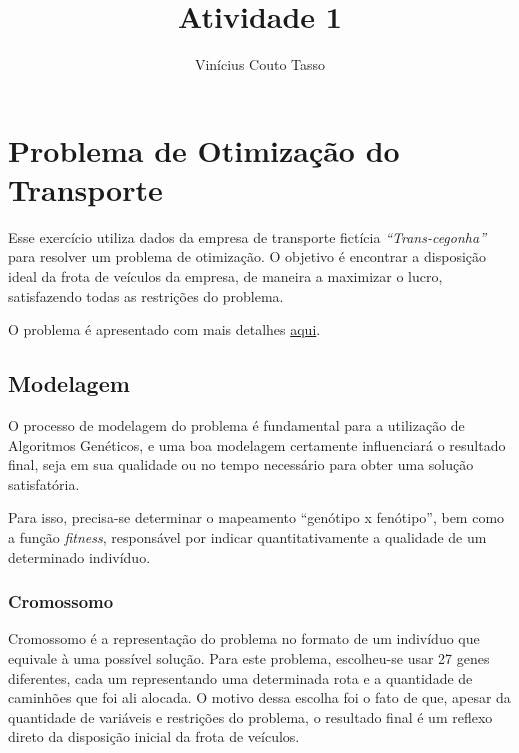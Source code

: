 \documentclass[11pt]{article}
\title{Atividade 1}
\author{Vinícius Couto Tasso}
\begin{document}
    
    \maketitle
    
    

    
    \hypertarget{problema-de-otimizauxe7uxe3o-do-transporte}{%
\section{Problema de Otimização do
Transporte}\label{problema-de-otimizauxe7uxe3o-do-transporte}}

Esse exercício utiliza dados da empresa de transporte fictícia
\emph{``Trans-cegonha''} para resolver um problema de otimização. O
objetivo é encontrar a disposição ideal da frota de veículos da empresa,
de maneira a maximizar o lucro, satisfazendo todas as restrições do
problema.

O problema é apresentado com mais detalhes \href{transporte4.pdf}{aqui}.

    \hypertarget{modelagem}{%
\subsection{Modelagem}\label{modelagem}}

O processo de modelagem do problema é fundamental para a utilização de
Algoritmos Genéticos, e uma boa modelagem certamente influenciará o
resultado final, seja em sua qualidade ou no tempo necessário para obter
uma solução satisfatória.

Para isso, precisa-se determinar o mapeamento ``genótipo x fenótipo'',
bem como a função \emph{fitness}, responsável por indicar
quantitativamente a qualidade de um determinado indivíduo.

    \hypertarget{cromossomo}{%
\subsubsection{Cromossomo}\label{cromossomo}}

Cromossomo é a representação do problema no formato de um indivíduo que
equivale à uma possível solução. Para este problema, escolheu-se usar 27
genes diferentes, cada um representando uma determinada rota e a
quantidade de caminhões que foi ali alocada. O motivo dessa escolha foi
o fato de que, apesar da quantidade de variáveis e restrições do
problema, o resultado final é um reflexo direto da disposição inicial da
frota de veículos.
\end{document}
